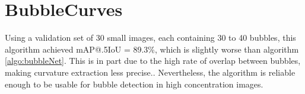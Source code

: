 			\section{BubbleCurves}\label{result_curves}

				Using a validation set of 30 small images, each containing 30 to 40 bubbles, this algorithm achieved mAP@.5IoU = 89.3\%, which is slightly worse than algorithm \ref{algo:bubbleNet}. This is in part due to the high rate of overlap between bubbles, making curvature extraction less precise.. Nevertheless, the algorithm is reliable enough to be usable for bubble detection in high concentration images.					
				
				
				
				
				
				
				
				
				
				
				